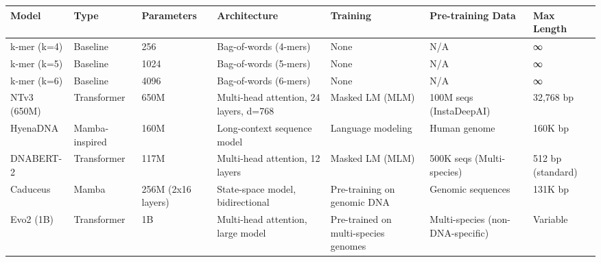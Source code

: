 \begin{tabular}{lllllll}
\toprule
Model & Type & Parameters & Architecture & Training & Pre-training Data & Max Length \\
\midrule
k-mer (k=4) & Baseline & 256 & Bag-of-words (4-mers) & None & N/A & ∞ \\
k-mer (k=5) & Baseline & 1024 & Bag-of-words (5-mers) & None & N/A & ∞ \\
k-mer (k=6) & Baseline & 4096 & Bag-of-words (6-mers) & None & N/A & ∞ \\
NTv3 (650M) & Transformer & 650M & Multi-head attention, 24 layers, d=768 & Masked LM (MLM) & 100M seqs (InstaDeepAI) & 32,768 bp \\
HyenaDNA & Mamba-inspired & 160M & Long-context sequence model & Language modeling & Human genome & 160K bp \\
DNABERT-2 & Transformer & 117M & Multi-head attention, 12 layers & Masked LM (MLM) & 500K seqs (Multi-species) & 512 bp (standard) \\
Caduceus & Mamba & 256M (2x16 layers) & State-space model, bidirectional & Pre-training on genomic DNA & Genomic sequences & 131K bp \\
Evo2 (1B) & Transformer & 1B & Multi-head attention, large model & Pre-trained on multi-species genomes & Multi-species (non-DNA-specific) & Variable \\
\bottomrule
\end{tabular}
